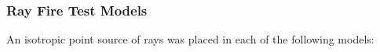 \documentclass[12pt]{beamer}
\begin{document}
\begin{frame}
\frametitle{Ray Fire Test Models}

An isotropic point source of rays was placed in each of the following models:
\vfill

\end{frame}
\end{document}
